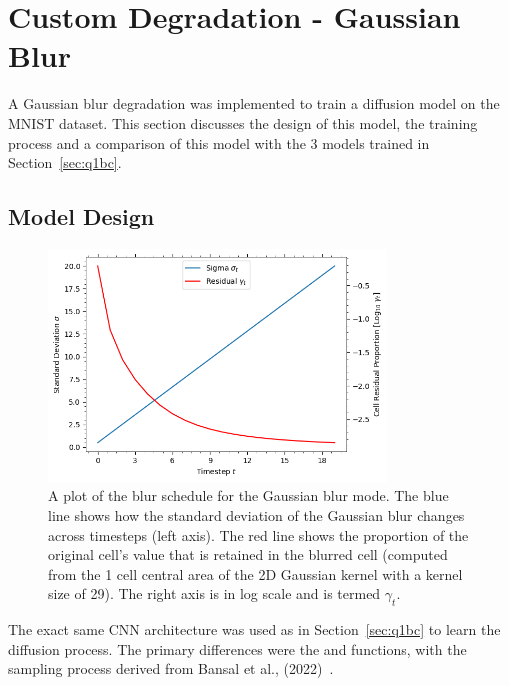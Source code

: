 
\section{Custom Degradation - Gaussian Blur}\label{sec:q2}
A Gaussian blur degradation was implemented to train a diffusion model on the MNIST dataset.
This section discusses the design of this model, the training process and a comparison of this model with the 3 models
trained in Section~\eqref{sec:q1bc}.

\subsection{Model Design}\label{subsec:model-design}
\begin{figure}[t]
    \centering
    \includegraphics[width=0.8\textwidth]{figures/q2_blur_schedule}
    \caption{A plot of the blur schedule for the Gaussian blur mode.
        The blue line shows how the standard deviation of the Gaussian blur changes across timesteps (left axis).
        The red line shows the proportion of the original cell's value that is retained in the blurred cell (computed from
        the 1 cell central area of the 2D Gaussian kernel with a kernel size of 29).
        The right axis is in log scale and is termed $\gamma_{t}$.}
    \label{fig:q2_blur_schedule}
\end{figure}

The exact same CNN architecture was used as in Section~\eqref{sec:q1bc} to learn the diffusion process.
The primary differences were the  and  functions, with the sampling process
derived from Bansal et al., (2022)~\cite{bansal}.

